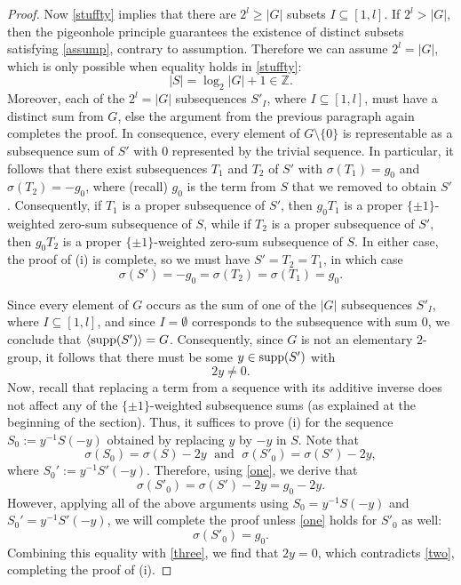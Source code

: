 \documentclass[11pt,reqno]{amsart}
\numberwithin{equation}{section}
\theoremstyle{definition}
\numberwithin{equation}{section}
\begin{document}
\begin{proof}
Now \eqref{stuffty} implies that there are $2^{l}\geq |G|$ subsets
$I\subseteq [1,l]$. If $2^l>|G|$, then the pigeonhole principle guarantees
the existence of distinct subsets satisfying \eqref{assump}, contrary to
assumption. Therefore we can assume $2^{l}= |G|$, which is only possible
when equality holds in \eqref{stuffty}: $$|S|= \log_2 |G|+1\in {\mathbb Z}.$$
Moreover, each of the $2^l=|G|$ subsequences $S'_I$, where $I\subseteq
[1,l]$, must have a distinct sum from $G$, else the argument from the
previous paragraph again  completes the proof. In consequence,
every element of $G\setminus \{0\}$ is  representable as a subsequence sum of $S'$ with
$0$ represented by the  trivial sequence. In particular, it follows that
there exist subsequences  $T_1$ and $T_2$ of $S'$ with $\sigma(T_1)=g_0$
and $\sigma(T_2)=-g_0$,  where (recall) $g_0$ is the term from $S$ that we
removed to obtain $S'$.  Consequently, if $T_1$ is a proper subsequence of
$S'$, then $g_0T_1$ is a  proper $\{\pm 1\}$-weighted zero-sum subsequence
of $S$, while if $T_2$ is  a proper subsequence of $S'$, then $g_0T_2$ is
a proper $\{\pm 1\}$-weighted  zero-sum subsequence of $S$. In either
case, the proof of (i) is  complete, so we must have $S'=T_2=T_1$, in
which case  \begin{equation}\label{one}\sigma(S')=-g_0=\sigma(T_2)=\sigma(T_1)=g_0.\end{equation}

Since  every element of $G$  occurs as the sum of one of the $|G|$
subsequences $S'_I$, where $I\subseteq [1,l]$, and since
$I=\emptyset$ corresponds to the subsequence with sum $0$, we
conclude that ${\langle} {\text{\rm supp}}(S'){\rangle}=G$. Consequently, since $G$ is not
an elementary $2$-group, it follows that there must be some $y\in
{\text{\rm supp}}(S')$ with \begin{equation}\label{two}2y\neq 0.\end{equation} Now, recall that
replacing a term from a sequence with its additive inverse does not
affect any of the $\{\pm 1\}$-weighted subsequence sums (as
explained at the beginning of the section). Thus, it suffices to
prove (i) for the sequence $S_0:=y^{-1}S(-y)$ obtained by replacing
$y$ by $-y$ in $S$. Note that $$\sigma(S_0)=\sigma(S)-2y{\;\mbox{ and } \;}
\sigma(S'_0)=\sigma(S')-2y,$$ where $S_0':=y^{-1}S'(-y)$. Therefore,
using \eqref{one}, we derive that
\begin{equation}\label{three}\sigma(S'_0)=\sigma(S')-2y=g_0-2y.\end{equation} However,
applying all of the above arguments using $S_0=y^{-1}S(-y)$ and
$S_0'=y^{-1}S'(-y)$, we will complete the proof unless \eqref{one}
holds for $S'_0$ as well:  $$\sigma(S'_0)=g_0.$$ Combining this
equality with \eqref{three}, we find that $2y=0$, which contradicts
\eqref{two}, completing the proof of (i).


\end{proof}
\end{document}

